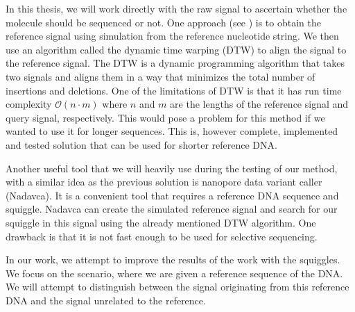In this thesis, we will work directly with the raw signal to ascertain whether the molecule
should be sequenced or not. One approach (see \cite{loose2016real}) is to obtain the reference signal using
simulation from the reference nucleotide string. We then use an algorithm called
the dynamic time warping (DTW) to align the signal to the reference signal.
The DTW is a dynamic programming algorithm that takes two signals and aligns them in a
way that minimizes the total number of insertions and deletions. One of the limitations
of DTW is that it has run time complexity $\mathcal{O}(n\cdot m)$ where $n$ and $m$
are the lengths of the reference signal and query signal, respectively. This would pose a problem
for this method if we wanted to use it for longer sequences. This is, however complete,
implemented and tested solution that can be used for shorter reference DNA.

Another useful tool that we will heavily use during the testing of our method, with a similar idea as the previous solution is
nanopore data variant caller (Nadavca). It is a convenient tool that requires a reference
DNA sequence and squiggle. Nadavca can create the simulated reference signal
and search for our squiggle in this signal using the already mentioned DTW algorithm.
One drawback is that it is not fast enough to be used for selective sequencing.

In our work, we attempt to improve the results of the work with the squiggles.
We focus on the scenario, where we are given a reference sequence of the DNA. We
will attempt to distinguish between the signal originating from this reference DNA and the
signal unrelated to the reference.
